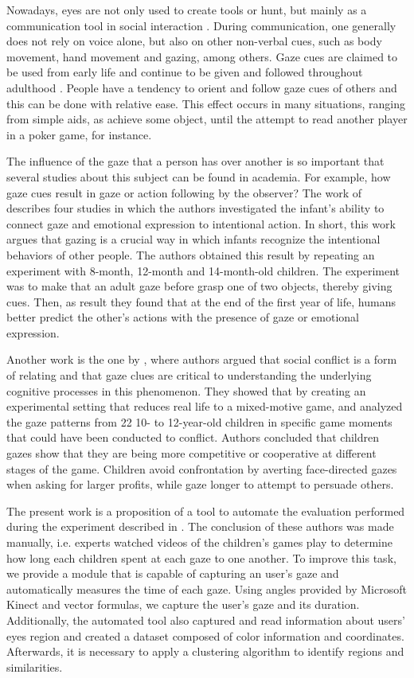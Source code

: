 \documentclass[10pt, conference]{IEEEtran}
\begin{document}
	Nowadays, eyes are not only used to create tools or hunt, but mainly as a communication tool in social interaction \cite{4}.
	During communication, one generally does not rely on voice alone, but also on other non-verbal cues, such as body movement, hand movement and gazing, among others.
	Gaze cues are claimed to be used from early life and continue to be given and followed throughout adulthood \cite{4}.
	People have a tendency to orient and follow gaze cues of others and this can be done with relative ease.
	This effect occurs in many situations, ranging from simple aids, as achieve some object, until the attempt to read another player in a poker game, for instance.

	The influence of the gaze that a person has over another is so important that several studies about this subject can be found in academia.
	For example, how gaze cues result in gaze or action following by the observer? 
	The work of \cite{5} describes four studies in which the authors investigated the infant's ability to connect gaze and emotional expression to intentional action.
	In short, this work argues that gazing is a crucial way in which infants recognize the intentional behaviors of other people. 
	The authors obtained this result by repeating an experiment with 8-month, 12-month and 14-month-old children. 
	The experiment was to make that an adult gaze before grasp one of two objects, thereby giving cues. 
	Then, as result they found that at the end of the first year of life, humans better predict the other's actions with the presence of gaze or emotional expression.
    
	Another work is the one by \cite{6}, where authors argued that social conflict is a form of relating and that gaze clues are critical to understanding the underlying cognitive processes in this phenomenon. 
	They showed that by creating an experimental setting that reduces real life to a mixed-motive game, and analyzed the gaze patterns from 22 10- to 12-year-old children in specific game moments that could have been conducted to conflict.
	Authors concluded that children gazes show that they are being more competitive or cooperative at different stages of the game.
	Children avoid confrontation by averting face-directed gazes when asking for larger profits, while gaze longer to attempt to persuade others.

	The present work is a proposition of a tool to automate the evaluation performed during the experiment described in \cite{6}.
	The conclusion of these authors was made manually, i.e. experts watched videos of the children's games play to determine how long each children spent at each gaze to one another.
	To improve this task, we provide a module that is capable of capturing an user's gaze and automatically measures the time of each gaze.
	Using angles provided by Microsoft Kinect and vector formulas, we capture the user's gaze and its duration.
	Additionally, the automated tool also captured and read information about users' eyes region and created a dataset composed of color information and coordinates.
	Afterwards, it is necessary to apply a clustering algorithm to identify regions and similarities. 
\end{document}
